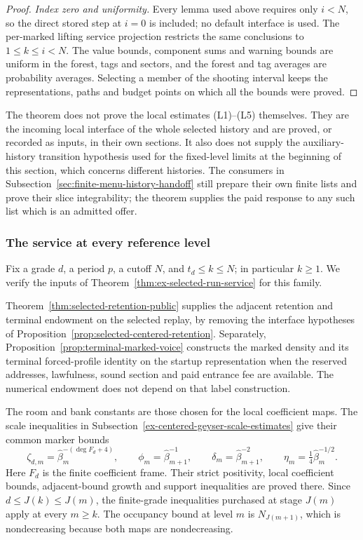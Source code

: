 \begin{proof}
\emph{Index zero and uniformity.} Every lemma used above requires only
$i<N$, so the direct stored step at $i=0$ is included; no default interface
is used. The per-marked lifting service projection restricts the same
conclusions to $1\le k\le i<N$. The value bounds, component sums and
warning bounds are uniform in the forest, tags and sectors, and the
forest and tag averages are probability averages. Selecting a member of
the shooting interval keeps the representations, paths and budget points
on which all the bounds were proved.
\end{proof}

The theorem does not prove the local estimates (L1)--(L5) themselves.
They are the incoming local interface of the whole selected history and
are proved, or recorded as inputs, in their own sections. It also does not
supply the auxiliary-history transition hypothesis used for the
fixed-level limits at the beginning of this section, which concerns
different histories. The consumers in
Subsection~\ref{sec:finite-menu-history-handoff} still prepare their own
finite lists and prove their slice integrability; the theorem supplies
the paid response to any such list which is an admitted offer.

\subsubsection{The service at every reference level}
Fix a grade $d$, a period $p$, a cutoff $N$, and
$t_d\le k\le N$; in particular $k\ge1$. We verify the inputs of
Theorem~\ref{thm:ex-selected-run-service} for this family.

Theorem~\ref{thm:selected-retention-public} supplies the adjacent
retention and terminal endowment on the selected replay, by removing
the interface hypotheses of
Proposition~\ref{prop:selected-centered-retention}. Separately,
Proposition~\ref{prop:terminal-marked-voice} constructs the marked density
and its terminal forced-profile identity on the startup representation
when the reserved addresses, lawfulness, sound section and paid
entrance fee are available. The numerical endowment does not depend
on that label construction.

The room and bank constants are those chosen for the local
coefficient maps. The scale inequalities in
Subsection~\ref{ex-centered-geyser-scale-estimates} give their common
marker bounds
\[
 \zeta_{d,m}=\widehat\beta_m^{-(\deg F_d+4)},\qquad
 \phi_m=\widehat\beta_{m+1}^{-1},\qquad
 \delta_m=\widehat\beta_{m+1}^{-2},\qquad
 \eta_m=\tfrac14\widehat\beta_m^{-1/2}.
\]
Here $F_d$ is the finite coefficient frame. Their strict positivity,
local coefficient bounds, adjacent-bound growth and support inequalities
are proved there. Since $d\le J(k)\le J(m)$, the finite-grade
inequalities purchased at stage $J(m)$ apply at every $m\ge k$.
The occupancy bound at level $m$ is $N_{J(m+1)}$, which is
nondecreasing because both maps are nondecreasing.

